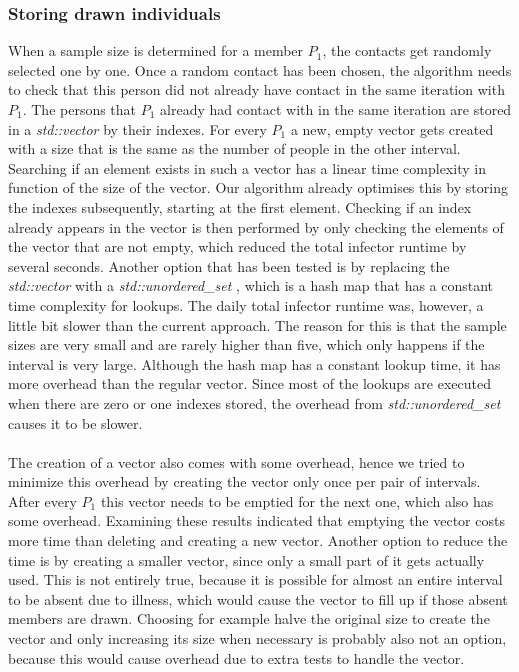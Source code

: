 \subsubsection{Storing drawn individuals}
When a sample size is determined for a member $P_{1}$, the contacts get randomly selected one by one. Once a random contact has been chosen, the algorithm needs to check that this person did not already have contact in the same iteration with $P_{1}$. The persons that $P_{1}$ already had contact with in the same iteration are stored in a \textit{std::vector} \cite{vector} by their indexes. For every $P_{1}$ a new, empty vector gets created with a size that is the same as the number of people in the other interval. Searching if an element exists in such a vector has a linear time complexity in function of the size of the vector. Our algorithm already optimises this by storing the indexes subsequently, starting at the first element. Checking if an index already appears in the vector is then performed by only checking the elements of the vector that are not empty, which reduced the total infector runtime by several seconds.  Another option that has been tested is by replacing the \textit{std::vector} with a \textit{std::unordered\_set} \cite{unordered_set}, which is a hash map that has a constant time complexity for lookups. The daily total infector runtime was, however, a little bit slower than the current approach. The reason for this is that the sample sizes are very small and are rarely higher than five, which only happens if the interval is very large. Although the hash map has a constant lookup time, it has more overhead than the regular vector. Since most of the lookups are executed when there are zero or one indexes stored, the overhead from \textit{std::unordered\_set} causes it to be slower.
\\\\
The creation of a vector also comes with some overhead, hence we tried to minimize this overhead by creating the vector only once per pair of intervals. After every $P_{1}$ this vector needs to be emptied for the next one, which also has some overhead. Examining these results indicated that emptying the vector costs more time than deleting and creating a new vector. Another option to reduce the time is by creating a smaller vector, since only a small part of it gets actually used. This is not entirely true, because it is possible for almost an entire interval to be absent due to illness, which would cause the vector to fill up if those absent members are drawn. Choosing for example halve the original size to create the vector and only increasing its size when necessary is probably also not an option, because this would cause overhead due to extra tests to handle the vector.

